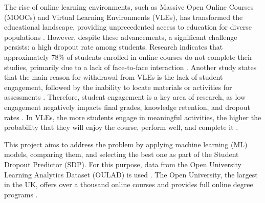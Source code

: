 \documentclass[ %
                    author={Carlos Duran Calle},
                supervisor={Dr. Felipe Campelo},
                    degree={MSc},
                     title={Comparative Machine Learning Analysis for Student Dropout Prediction in a Virtual Learning Environment},
                  subtitle={Incorporating Student Engagement and Socio-Economic Features},
                      type={},
                      year={2025}]{dissertation}
\begin{document}
\noindent
%
The rise of online learning environments, such as Massive Open Online Courses (MOOCs) and Virtual Learning Environments (VLEs), has transformed the educational landscape, providing unprecedented access to education for diverse populations \cite{maiz_olazabalaga_research_2016}. However, despite these advancements, a significant challenge persists: a high dropout rate among students. Research indicates that approximately $78\%$ of students enrolled in online courses do not complete their studies, primarily due to a lack of face-to-face interaction \cite{simpson_can_we_do_better}. Another study states that the main reason for withdrawal from VLEs is the lack of student engagement, followed by the inability to locate materials or activities for assessments \cite{kuzilek_ou_2015}. Therefore, student engagement is a key area of research, as low engagement negatively impacts final grades, knowledge retention, and dropout rates \cite{staikopoulos_SE_2015}. In VLEs, the more students engage in meaningful activities, the higher the probability that they will enjoy the course, perform well, and complete it \cite{jung_learning_2018}.

This project aims to address the problem by applying machine learning (ML) models, comparing them, and selecting the best one as part of the Student Dropout Predictor (SDP). For this purpose, data from the Open University Learning Analytics Dataset (OULAD) is used \cite{kuzilek_OULAD_2017}. The Open University, the largest in the UK, offers over a thousand online courses and provides full online degree programs \cite{hlosta_modellingVLE_2018}.
\end{document}
